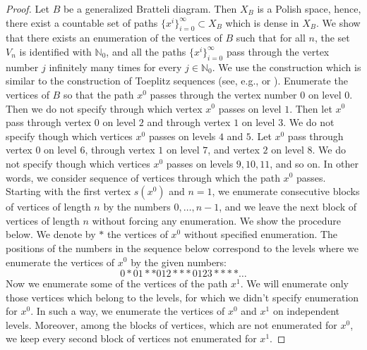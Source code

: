 \documentclass[11pt, twoside]{amsart}
\theoremstyle{definition}
\theoremstyle{remark}
\theoremstyle{plain}
\newcommand{\tcr}{\textcolor{red}}
\def\ov{\overline}
\newcommand{\N}{\mathbb N}
\numberwithin{equation}{section}
\begin{document}
\begin{proof} 
    Let $B$ be a generalized Bratteli diagram. Then $X_B$ is a Polish space, hence, there exist a countable set of paths $\{x^{i}\}_{i = 0}^{\infty} \subset X_B$ which is dense in $X_B$. We show that there exists an enumeration of the vertices of $B$ such that for all $n$, the set $V_n$ is identified with $\N_0$, and all the paths $\{x^{i}\}_{i = 0}^{\infty}$ pass through the vertex number $j$ infinitely many times for every $j \in \N_0$.
We use the construction which is similar to the construction of Toeplitz sequences (see, e.g., \cite{Kurka2003} or \cite{Downarowicz2005}). Enumerate the vertices of $B$ so that the path $x^0$ passes through the vertex number $0$ on level $0$. Then we do not specify through which vertex  $x^0$ passes on level $1$. Then let $x^0$ pass  through vertex $0$ on level $2$ and through vertex $1$ on level $3$. We do not specify though which vertices $x^0$ passes on levels $4$ and $5$. Let $x^0$ pass through vertex $0$ on level $6$, through vertex $1$ on level $7$, and vertex $2$ on level $8$. 
We do not specify though which vertices $x^0$ passes on levels $9,10,11$, 
and so on. In other words, we consider sequence of vertices through which the path $x^0$ passes. Starting with the first vertex $s(x^0)$ and $n = 1$, we enumerate consecutive blocks of vertices of length $n$ by the numbers $0, \ldots, n-1$, and we leave the next block of vertices of length $n$ without forcing any enumeration. We show the procedure below. We denote by $*$ the vertices of $x^0$ without specified enumeration. The positions of the numbers in the sequence below correspond to the levels where we enumerate the vertices of $x^0$ by the given numbers:
\begin{equation}\label{x^0}
0*01**012***0123****\ldots
\end{equation}
Now we enumerate some of the vertices of the path $x^1$. We will enumerate only those vertices which belong to the levels, for which we didn't specify enumeration for $x^0$. In such a way, we enumerate the vertices of $x^0$ and $x^1$ on independent levels. Moreover, among the blocks of vertices, which are not enumerated for $x^0$, we keep every second block of vertices not enumerated for $x^1$.  

\end{proof}
\end{document}
